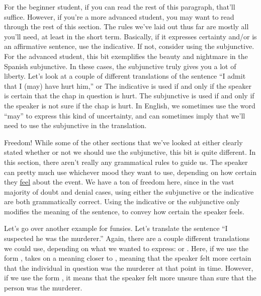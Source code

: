 For the beginner student, if you can read the rest of this paragraph, that'll suffice. However, if you're a more advanced student, you may want to read through the rest of this section. The rules we've laid out thus far are mostly all you'll need, at least in the short term. Basically, if it expresses certainty and/or is an affirmative sentence, use the indicative. If not, consider using the subjunctive. \\

For the advanced student, this bit exemplifies the beauty and nightmare in the Spanish subjunctive. In these cases, the subjunctive truly gives you a lot of liberty. Let's look at a couple of different translations of the sentence ``I admit that I (may) have hurt him,''  or  The indicative is used if and only if the speaker is certain that the chap in question is hurt. The subjunctive is used if and only if the speaker is not sure if the chap is hurt. In English, we sometimes use the word ``may'' to express this kind of uncertainty, and can sometimes imply that we'll need to use the subjunctive in the translation.

\begin{conf}{Freedom!}
	While some of the other sections that we've looked at either clearly stated whether or not we should use the subjunctive, this bit is quite different. In this section, there aren't really any grammatical rules to guide us. The speaker can pretty much use whichever mood they want to use, depending on how certain they \underline{feel} about the event. We have a ton of freedom here, since in the vast majority of doubt and denial cases, using either the subjunctive or the indicative are both grammatically correct. Using the indicative or the subjunctive only modifies the meaning of the sentence, to convey how certain the speaker feels. 
\end{conf}

Let's go over another example for funsies. Let's translate the sentence ``I suspected he was the murderer.'' Again, there are a couple different translations we could use, depending on what we wanted to express:  or . Here, if we use the form ,  takes on a meaning closer to , meaning that the speaker felt more certain that the individual in question was the murderer at that point in time. However, if we use the form , it means that the speaker felt more unsure than sure that the person was the murderer. 
